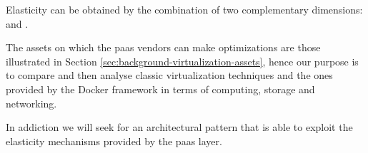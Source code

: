 Elasticity can be obtained by the combination of two complementary dimensions:  and .

The assets on which the \ac{paas} vendors can make optimizations are those illustrated in Section
\ref{sec:background-virtualization-assets}, hence our purpose is to compare and then analyse
classic virtualization techniques and the ones provided by the Docker framework in terms of computing,
storage and networking.

In addiction we will seek for an architectural pattern that is able to exploit the elasticity mechanisms 
provided by the \ac{paas} layer.